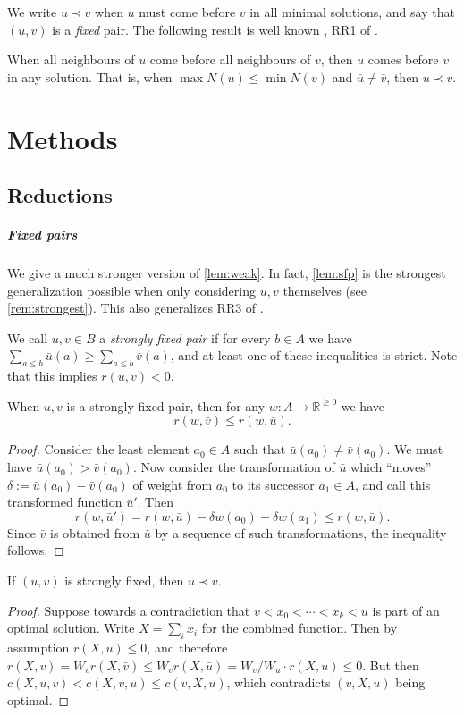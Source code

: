\documentclass[a4paper,UKenglish,cleveref, autoref, thm-restate]{lipics-v2021}
\renewcommand{\b}{\prec}
\begin{document}
We write $u\b v$ when $u$ must come before $v$ in all minimal solutions, and say that $(u, v)$
is a \emph{fixed} pair. The following result is well known \cite[Lemma
  1]{dujmovic_2004}, RR1 of \cite{dujmovic_2008}.

\begin{observation}\label{lem:weak}
  When all neighbours of $u$ come before all neighbours of $v$, then $u$ comes
  before $v$ in any solution.
  That is, when $\max N(u) \leq \min N(v)$ and $\bar u\neq \bar v$, then $u\b v$.
\end{observation}

\section{Methods}
\subsection{Reductions}
\subparagraph{Fixed pairs}
We give a much stronger version of \cref{lem:weak}. In fact, \cref{lem:sfp} is the strongest
generalization possible when only considering $u, v$ themselves (see
\cref{rem:strongest}). This also generalizes RR3 of \cite{dujmovic_2008}.
\begin{definition}
    We call $u, v \in B$ a \emph{strongly fixed pair} if for every $b \in A$ we have ${\sum_{a
    \leq b} \bar u(a) \geq \sum_{a \leq b} \bar v(a)}$, and at least one of these inequalities
    is strict. Note that this implies $r(u, v) < 0$.
\end{definition}
\begin{lemma}\label{lem:sfp} When $u, v$ is a strongly fixed pair,
    then for any $w: A\to \mathbb R^{\geq 0}$ we have 
    \[
        r(w, \bar v) \leq r(w, \bar u).
    \]
\end{lemma}
\begin{proof}
    Consider the least element $a_0 \in A$ such that $\bar u(a_0) \neq
    \bar v(a_0)$. We must have $\bar u(a_0) > \bar v(a_0)$. Now consider the transformation of
    $\bar u$ which ``moves'' $\delta := \bar u(a_0) - \bar v(a_0)$ of weight from $a_0$ to its
    successor $a_1 \in A$, and call this transformed function $\bar u'$. Then
    \[
        r(w, \bar u') = r(w, \bar u) - \delta w(a_0) - \delta w(a_1) \leq r(w, \bar u).
    \]
    Since $\bar v$ is obtained from $\bar u$ by a sequence of such transformations,
    the inequality follows.
\end{proof}
\begin{lemma}\label{lem:sfimplf}
    If $(u, v)$ is strongly fixed, then $u \b v$.
\end{lemma}
\begin{proof}
    Suppose towards a contradiction that $v < x_0 < \cdots < x_k < u$ is part of an optimal
    solution. Write $X = \sum_i x_i$ for the combined function. Then by assumption $r(X, u)
    \leq 0$, and therefore $r(X, v) = W_v r(X, \bar v) \leq W_v r(X, \bar u) = W_v / W_u \cdot
    r(X, u) \leq 0$. But then $c(X, u, v) < c(X, v, u)\leq c(v, X, u)$, which
    contradicts $(v,X,u)$ being optimal.
\end{proof}
\end{document}
